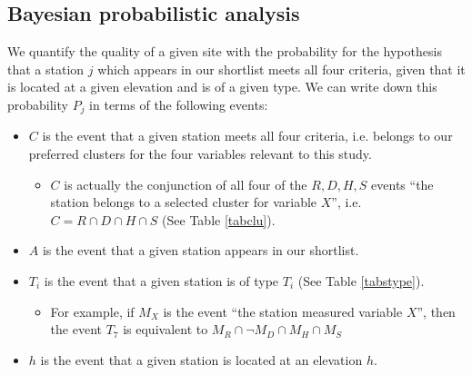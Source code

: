 \documentclass[12pt]{iopart}
\begin{document}
\subsection{Bayesian probabilistic analysis}\label{bpa}

We quantify the quality of a given site with the probability for the hypothesis that a station $j$ which appears in our shortlist meets all four criteria, given that it is located at a given elevation and is of a given type. We can write down this probability $P_j$ in terms of the following events:

\begin{itemize}
\item $C$ is the event that a given station meets all four criteria, i.e. belongs to our preferred clusters for the four variables relevant to this study.
\begin{itemize}
\item $C$ is actually the conjunction of all four of the $R,D,H,S$ events ``the station belongs to a selected cluster for variable $X$'', i.e. $C=R\cap D\cap H \cap S$ (See Table \ref{tabclu}).
\end{itemize}
\item $A$ is the event that a given station appears in our shortlist.
\item $T_i$ is the event that a given station is of type $T_i$ (See Table \ref{tabstype}).
\begin{itemize}
\item For example, if $M_X$ is the event ``the station measured variable $X$'', then the event $T_7$ is equivalent to $M_R\cap \neg M_D\cap M_H \cap M_S$
\end{itemize}
\item $h$ is the event that a given station is located at an elevation $h$.
\end{itemize}
\end{document}
